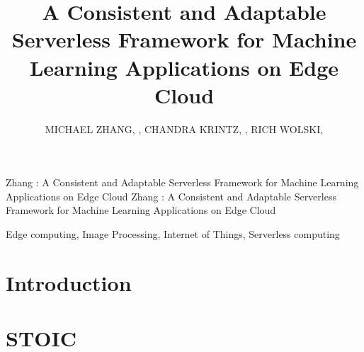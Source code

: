 \documentclass{ieeeaccess}
\begin{document}

\title{A Consistent and Adaptable Serverless Framework for Machine Learning Applications on Edge Cloud}
\author{\uppercase{Michael Zhang}, ,
\uppercase{Chandra Krintz}, , \uppercase{Rich Wolski},
}
\address[1]{Racelab, University of California, Santa Barbara, CA  93106-5110 U.S.A}


\markboth
{Zhang \headeretal: A Consistent and Adaptable Serverless Framework for Machine Learning Applications on Edge Cloud}
{Zhang \headeretal: A Consistent and Adaptable Serverless Framework for Machine Learning Applications on Edge Cloud}


\begin{abstract}
\label{sec:abstract}

\end{abstract}

\begin{keywords}
Edge computing, Image Processing, Internet of Things, Serverless computing
\end{keywords}

\titlepgskip=-15pt

\maketitle

\section{Introduction}
\label{sec:introduction}


\section{STOIC}
\label{sec:STOIC}

\end{document}
